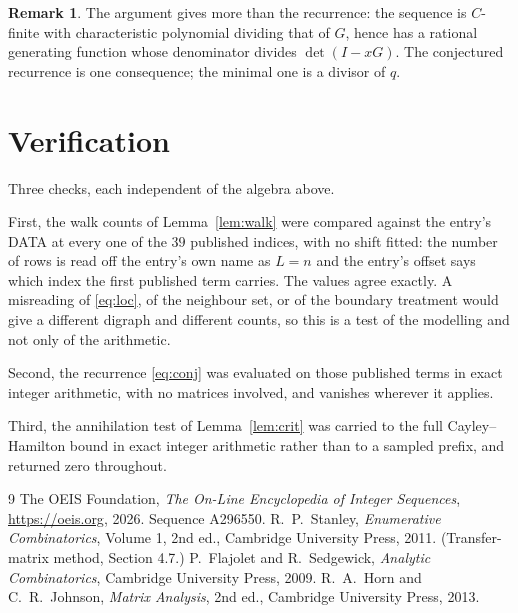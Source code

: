 \documentclass[11pt,a4paper]{article}
\theoremstyle{plain}
\theoremstyle{definition}
\newtheorem{remark}[theorem]{Remark}
\begin{document}
\begin{remark}
The argument gives more than the recurrence: the sequence is $C$-finite with characteristic
polynomial dividing that of $G$, hence has a rational generating function whose denominator
divides $\det(I-xG)$. The conjectured recurrence is one consequence; the minimal one is a
divisor of $q$.
\end{remark}

\section{Verification}

Three checks, each independent of the algebra above.

First, the walk counts of Lemma~\ref{lem:walk} were compared against the entry's DATA at
every one of the $39$ published indices, with no shift fitted: the number of rows is
read off the entry's own name as $L=n$ and the entry's offset says which index the first
published term carries. The values agree exactly. A misreading of \eqref{eq:loc}, of the
neighbour set, or of the boundary treatment would give a different digraph and different
counts, so this is a test of the modelling and not only of the arithmetic.

Second, the recurrence \eqref{eq:conj} was evaluated on those published terms in exact
integer arithmetic, with no matrices involved, and vanishes wherever it applies.

Third, the annihilation test of Lemma~\ref{lem:crit} was carried to the full
Cayley--Hamilton bound in exact integer arithmetic rather than to a sampled prefix, and
returned zero throughout.

\begin{thebibliography}{9}
 The OEIS Foundation, \emph{The On-Line Encyclopedia of Integer
Sequences}, \url{https://oeis.org}, 2026. Sequence A296550.
 R.~P.~Stanley, \emph{Enumerative Combinatorics}, Volume 1, 2nd ed.,
Cambridge University Press, 2011. (Transfer-matrix method, Section 4.7.)
 P.~Flajolet and R.~Sedgewick, \emph{Analytic Combinatorics}, Cambridge
University Press, 2009.
 R.~A.~Horn and C.~R.~Johnson, \emph{Matrix Analysis}, 2nd ed., Cambridge
University Press, 2013.
\end{thebibliography}
\end{document}
